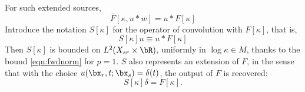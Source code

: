 For such extended sources,
\[
  \bar{F}[\kappa,u*w] = u*F[\kappa]
\]
Introduce the notation $S[\kappa]$ for the operator of convolution
with $F[\kappa]$, that is,
\begin{equation}
  \label{eqn:sdef}
  S[\kappa]u \equiv u*F[\kappa]
\end{equation}
Then $S[\kappa]$ is bounded on $L^2(X_{sr} \times \bR)$, uniformly in
$\log \kappa \in M$, thanks to
the bound \ref{eqn:fwdnorm} for $p=1$. $S$ also represents an
extension of $F$, in the sense that with the choice
$u(\bx_r,t;\bx_s)=\delta(t)$, the output of $F$ is recovered:
\begin{equation}
  \label{eqn:sconsist}
  S[\kappa]\delta = F[\kappa].
\end{equation}



